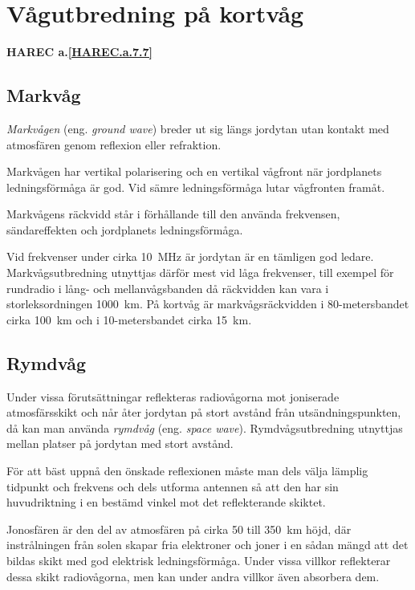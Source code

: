 \section{Vågutbredning på kortvåg}
\textbf{
HAREC a.\ref{HAREC.a.7.7}\label{myHAREC.a.7.7}
}

\subsection{Markvåg}

\emph{Markvågen} (eng. \emph{ground wave}) breder ut sig längs jordytan utan
kontakt med atmosfären genom reflexion eller refraktion.

Markvågen har vertikal polarisering och en vertikal vågfront när
jordplanets ledningsförmåga är god.
Vid sämre ledningsförmåga lutar vågfronten framåt.

Markvågens räckvidd står i förhållande till den använda frekvensen,
sändareffekten och jordplanets ledningsförmåga.

Vid frekvenser under cirka 10~MHz är jordytan är en tämligen god ledare.
Markvågsutbredning utnyttjas därför mest vid låga frekvenser, till exempel för
rundradio i lång- och mellanvågsbanden då räckvidden kan vara i
storleksordningen 1000~km.
På kortvåg är markvågsräckvidden i 80-metersbandet cirka 100~km och i
10-metersbandet cirka 15~km.

\subsection{Rymdvåg}

Under vissa förutsättningar reflekteras radiovågorna mot joniserade
atmosfärsskikt och når åter jordytan på stort avstånd från utsändningspunkten,
då kan man använda \emph{rymdvåg} (eng. \emph{space wave}).
Rymdvågsutbredning utnyttjas mellan platser på jordytan med stort avstånd.

För att bäst uppnå den önskade reflexionen måste man dels välja
lämplig tidpunkt och frekvens och dels utforma antennen så att den har
sin huvudriktning i en bestämd vinkel mot det reflekterande skiktet.

Jonosfären är den del av atmosfären på cirka 50 till 350~km höjd, där
instrålningen från solen skapar fria elektroner och joner i en sådan
mängd att det bildas skikt med god elektrisk ledningsförmåga.
Under vissa villkor reflekterar dessa skikt radiovågorna, men kan under
andra villkor även absorbera dem.

